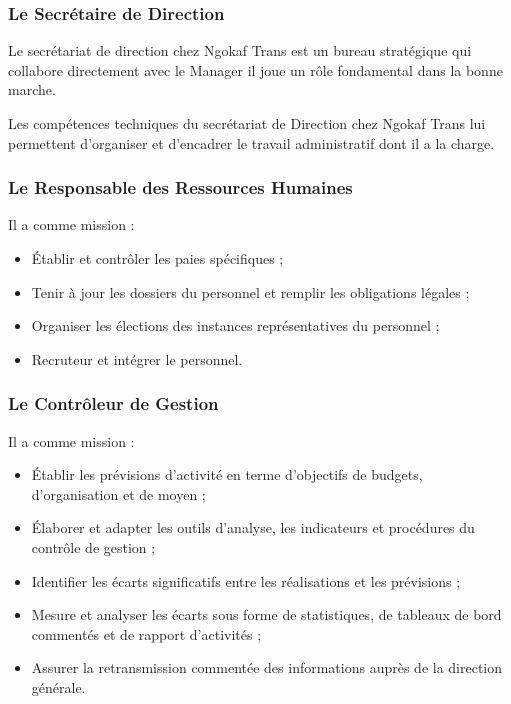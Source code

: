             \subsubsection[Le Secrétaire de Direction]{Le Secrétaire de Direction}
            Le secrétariat de direction chez Ngokaf Trans est un bureau stratégique
            qui collabore directement avec le Manager il joue un rôle fondamental dans
            la bonne marche.
            \par\noindent
            Les compétences techniques du secrétariat de Direction chez Ngokaf Trans
            lui permettent d’organiser et d’encadrer le travail administratif dont il a la charge.

            \subsubsection[Le Responsable des Ressources Humaines]{Le Responsable des Ressources Humaines}
            Il a comme mission :
            \par
                \begin{itemize}
                    \setlength{\itemsep}{0pt}
                    \item [\ding{226}] Établir et contrôler les paies spécifiques ;
                    \item [\ding{226}] Tenir à jour les dossiers du personnel et remplir les obligations légales ;
                    \item [\ding{226}] Organiser les élections des instances représentatives du personnel ;
                    \item [\ding{226}] Recruteur et intégrer le personnel.
                \end{itemize}
            \subsubsection[Le Contrôleur de Gestion]{Le Contrôleur de Gestion}
            Il a comme mission :
            \par
                \begin{itemize}
                    \setlength{\itemsep}{0pt}
                    \item [\ding{226}] Établir les prévisions d’activité en terme d’objectifs de budgets,
                    d’organisation et de moyen ;
                    \item [\ding{226}] Élaborer et adapter les outils d’analyse, les indicateurs et
                    procédures du contrôle de gestion ;
                    \item [\ding{226}] Identifier les écarts significatifs entre les réalisations et les prévisions ;
                    \item [\ding{226}] Mesure et analyser les écarts sous forme de statistiques, de tableaux de bord commentés et de rapport d’activités ;
                    \item [\ding{226}] Assurer la retransmission commentée des informations auprès de la direction générale.
                \end{itemize} 

